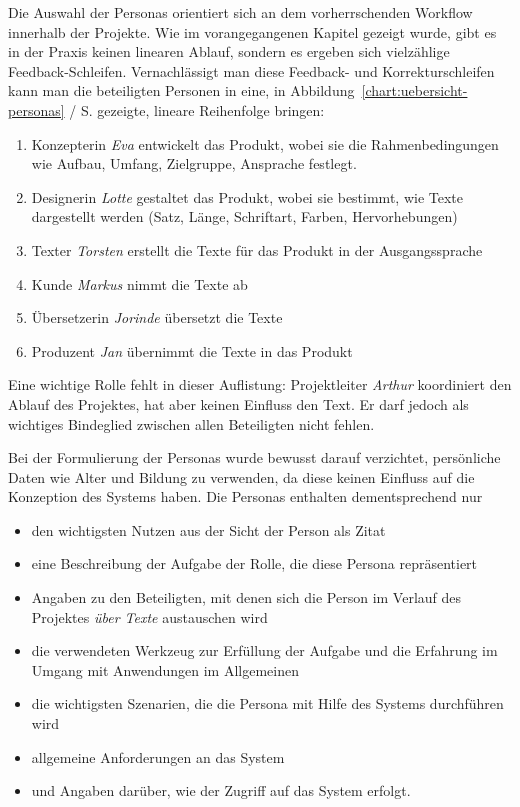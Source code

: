 Die Auswahl der Personas orientiert sich an dem vorherrschenden Workflow innerhalb der Projekte. Wie im vorangegangenen Kapitel gezeigt wurde, gibt es in der Praxis keinen linearen Ablauf, sondern es ergeben sich vielzählige Feedback-Schleifen. Vernachlässigt man diese Feedback- und Korrekturschleifen kann man die beteiligten Personen in eine, in Abbildung~\ref{chart:uebersicht-personas} / S.\pageref{chart:uebersicht-personas} gezeigte, lineare Reihenfolge bringen:
\begin{samepage}\begin{enumerate}\itemsep -5pt
\item Konzepterin \emph{Eva} entwickelt das Produkt, wobei sie die Rahmenbedingungen wie Aufbau, Umfang, Zielgruppe, Ansprache festlegt. 
\item Designerin \emph{Lotte} gestaltet das Produkt, wobei sie bestimmt, wie Texte dargestellt werden (Satz, Länge, Schriftart, Farben, Hervorhebungen)
\item Texter \emph{Torsten} erstellt die Texte für das Produkt in der Ausgangssprache
\item Kunde \emph{Markus} nimmt die Texte ab
\item Übersetzerin \emph{Jorinde} übersetzt die Texte
\item Produzent \emph{Jan} übernimmt die Texte in das Produkt
\end{enumerate}\end{samepage}

Eine wichtige Rolle fehlt in dieser Auflistung: Projektleiter \emph{Arthur} koordiniert den Ablauf des Projektes, hat aber keinen Einfluss den Text. Er darf jedoch als wichtiges Bindeglied zwischen allen Beteiligten  nicht fehlen.

Bei der Formulierung der Personas wurde bewusst darauf verzichtet, persönliche Daten wie Alter und Bildung zu verwenden, da diese keinen Einfluss auf die Konzeption des Systems haben. Die Personas enthalten dementsprechend nur 
\begin{itemize}\itemsep -5pt
\item den wichtigsten Nutzen aus der Sicht der Person als Zitat
\item eine Beschreibung der Aufgabe der Rolle, die diese Persona repräsentiert
\item Angaben zu den Beteiligten, mit denen sich die Person im Verlauf des Projektes \emph{über Texte} austauschen wird
\item die verwendeten Werkzeug zur Erfüllung der Aufgabe und die Erfahrung im Umgang mit Anwendungen im Allgemeinen
\item die wichtigsten Szenarien, die die Persona mit Hilfe des Systems durchführen wird
\item allgemeine Anforderungen an das System
\item und Angaben darüber, wie der Zugriff auf das System erfolgt.
\end{itemize}


